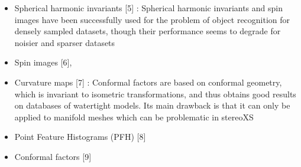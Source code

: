     \begin{itemize}
        \item Spherical harmonic invariants [5] : Spherical harmonic invariants and spin images have been
          successfully used for the problem of object recognition for
          densely sampled datasets, though their performance seems
          to degrade for noisier and sparser datasets

        \item Spin images [6], 
        \item Curvature maps [7] :  Conformal factors are
          based on conformal geometry, which is invariant to isometric
          transformations, and thus obtains good results on databases
          of watertight models. Its main drawback is that it can only
          be applied to manifold meshes which can be problematic
          in stereoXS
        \item Point Feature Histograms (PFH) [8]
        \item Conformal factors [9]
    \end{itemize}




